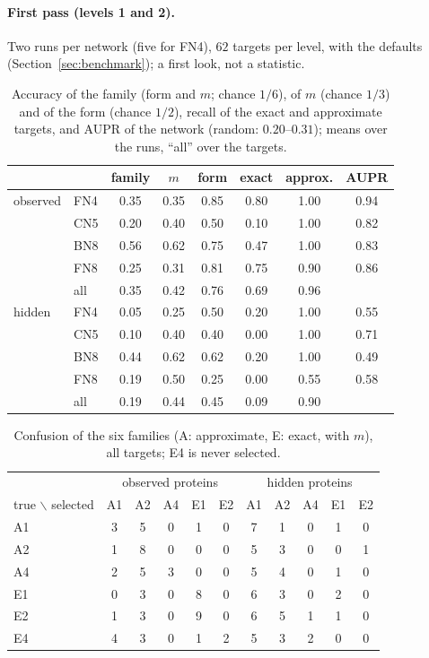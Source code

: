 \documentclass[a4paper, 11pt]{article}
\theoremstyle{plain}
\theoremstyle{remark}
\begin{document}
\paragraph{First pass (levels 1 and 2).} Two runs per network (five for FN4), $62$ targets per level, with the defaults (Section~\ref{sec:benchmark}); a first look, not a statistic.

\begin{table}[h]
\centering\small
\begin{tabular}{llcccccc}
\toprule
 & & family & $m$ & form & exact & approx. & AUPR \\
\midrule
observed & FN4 & 0.35 & 0.35 & 0.85 & 0.80 & 1.00 & 0.94 \\
 & CN5 & 0.20 & 0.40 & 0.50 & 0.10 & 1.00 & 0.82 \\
 & BN8 & 0.56 & 0.62 & 0.75 & 0.47 & 1.00 & 0.83 \\
 & FN8 & 0.25 & 0.31 & 0.81 & 0.75 & 0.90 & 0.86 \\
 & all & 0.35 & 0.42 & 0.76 & 0.69 & 0.96 & \\
\midrule
hidden & FN4 & 0.05 & 0.25 & 0.50 & 0.20 & 1.00 & 0.55 \\
 & CN5 & 0.10 & 0.40 & 0.40 & 0.00 & 1.00 & 0.71 \\
 & BN8 & 0.44 & 0.62 & 0.62 & 0.20 & 1.00 & 0.49 \\
 & FN8 & 0.19 & 0.50 & 0.25 & 0.00 & 0.55 & 0.58 \\
 & all & 0.19 & 0.44 & 0.45 & 0.09 & 0.90 & \\
\bottomrule
\end{tabular}
\caption{Accuracy of the family (form and $m$; chance $1/6$), of $m$ (chance $1/3$) and of the form (chance $1/2$), recall of the exact and approximate targets, and AUPR of the network (random: $0.20$--$0.31$); means over the runs, ``all'' over the targets.}
\label{tab:forms}
\end{table}

\begin{table}[h]
\centering\small
\begin{tabular}{l|ccccc|ccccc}
\toprule
 & \multicolumn{5}{c|}{observed proteins} & \multicolumn{5}{c}{hidden proteins} \\
true $\backslash$ selected & A1 & A2 & A4 & E1 & E2 & A1 & A2 & A4 & E1 & E2 \\
\midrule
A1 & 3 & 5 & 0 & 1 & 0 & 7 & 1 & 0 & 1 & 0 \\
A2 & 1 & 8 & 0 & 0 & 0 & 5 & 3 & 0 & 0 & 1 \\
A4 & 2 & 5 & 3 & 0 & 0 & 5 & 4 & 0 & 1 & 0 \\
E1 & 0 & 3 & 0 & 8 & 0 & 6 & 3 & 0 & 2 & 0 \\
E2 & 1 & 3 & 0 & 9 & 0 & 6 & 5 & 1 & 1 & 0 \\
E4 & 4 & 3 & 0 & 1 & 2 & 5 & 3 & 2 & 0 & 0 \\
\bottomrule
\end{tabular}
\caption{Confusion of the six families (A: approximate, E: exact, with $m$), all targets; E4 is never selected.}
\label{tab:confusion}
\end{table}
\end{document}
